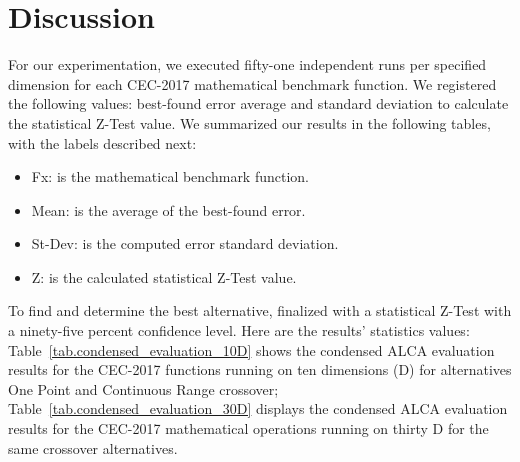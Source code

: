 \documentclass[graybox]{svmult}
\begin{document}
\section{Discussion}
    \label{section.discussion}

    For our experimentation, we executed fifty-one independent runs per specified dimension for each CEC-2017 mathematical benchmark function. We registered the following values: best-found error average and standard deviation to calculate the statistical Z-Test value. We summarized our results in the following tables, with the labels described next:

    \begin{itemize}
        \item   Fx:          is the mathematical benchmark function.
        \item   Mean:        is the average of the best-found error.
        \item   St-Dev:      is the computed error standard deviation. 
        \item   Z:           is the calculated statistical Z-Test value.
    \end{itemize}

    To find and determine the best alternative, finalized with a statistical Z-Test with a ninety-five percent confidence level. Here are the results' statistics values: Table~\ref{tab.condensed_evaluation_10D} shows the condensed ALCA evaluation results for the CEC-2017 functions running on ten dimensions (D) for alternatives One Point and Continuous Range crossover; Table~\ref{tab.condensed_evaluation_30D} displays the condensed ALCA evaluation results for the CEC-2017 mathematical operations running on thirty D for the same crossover alternatives.
\end{document}
